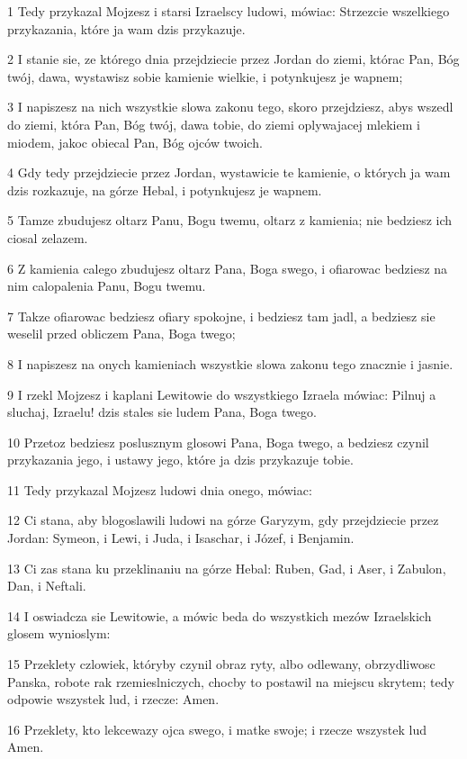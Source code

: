 \par 1 Tedy przykazal Mojzesz i starsi Izraelscy ludowi, mówiac: Strzezcie wszelkiego przykazania, które ja wam dzis przykazuje.
\par 2 I stanie sie, ze którego dnia przejdziecie przez Jordan do ziemi, którac Pan, Bóg twój, dawa, wystawisz sobie kamienie wielkie, i potynkujesz je wapnem;
\par 3 I napiszesz na nich wszystkie slowa zakonu tego, skoro przejdziesz, abys wszedl do ziemi, która Pan, Bóg twój, dawa tobie, do ziemi oplywajacej mlekiem i miodem, jakoc obiecal Pan, Bóg ojców twoich.
\par 4 Gdy tedy przejdziecie przez Jordan, wystawicie te kamienie, o których ja wam dzis rozkazuje, na górze Hebal, i potynkujesz je wapnem.
\par 5 Tamze zbudujesz oltarz Panu, Bogu twemu, oltarz z kamienia; nie bedziesz ich ciosal zelazem.
\par 6 Z kamienia calego zbudujesz oltarz Pana, Boga swego, i ofiarowac bedziesz na nim calopalenia Panu, Bogu twemu.
\par 7 Takze ofiarowac bedziesz ofiary spokojne, i bedziesz tam jadl, a bedziesz sie weselil przed obliczem Pana, Boga twego;
\par 8 I napiszesz na onych kamieniach wszystkie slowa zakonu tego znacznie i jasnie.
\par 9 I rzekl Mojzesz i kaplani Lewitowie do wszystkiego Izraela mówiac: Pilnuj a sluchaj, Izraelu! dzis stales sie ludem Pana, Boga twego.
\par 10 Przetoz bedziesz poslusznym glosowi Pana, Boga twego, a bedziesz czynil przykazania jego, i ustawy jego, które ja dzis przykazuje tobie.
\par 11 Tedy przykazal Mojzesz ludowi dnia onego, mówiac:
\par 12 Ci stana, aby blogoslawili ludowi na górze Garyzym, gdy przejdziecie przez Jordan: Symeon, i Lewi, i Juda, i Isaschar, i Józef, i Benjamin.
\par 13 Ci zas stana ku przeklinaniu na górze Hebal: Ruben, Gad, i Aser, i Zabulon, Dan, i Neftali.
\par 14 I oswiadcza sie Lewitowie, a mówic beda do wszystkich mezów Izraelskich glosem wynioslym:
\par 15 Przeklety czlowiek, któryby czynil obraz ryty, albo odlewany, obrzydliwosc Panska, robote rak rzemieslniczych, chocby to postawil na miejscu skrytem; tedy odpowie wszystek lud, i rzecze: Amen.
\par 16 Przeklety, kto lekcewazy ojca swego, i matke swoje; i rzecze wszystek lud Amen.
